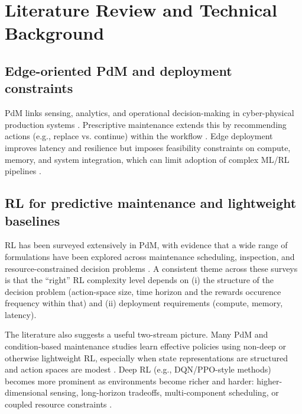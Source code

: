 \documentclass[sn-basic]{sn-jnl} %
\begin{document}
\section{Literature Review and Technical Background}
\label{sec:lit_tech}
\subsection{Edge-oriented PdM and deployment constraints}
PdM links sensing, analytics, and operational decision-making in cyber-physical production systems \cite{Compare2020, Zonta2020}. Prescriptive maintenance extends this by recommending actions (e.g., replace vs. continue) within the workflow \cite{Ansari2019}. Edge deployment improves latency and resilience but imposes feasibility constraints on compute, memory, and system integration, which can limit adoption of complex ML/RL pipelines \cite{Njor2024, Pandey2023}.

\subsection{RL for predictive maintenance and lightweight baselines}
RL has been surveyed extensively in PdM, with evidence that a wide range of formulations have been explored across maintenance scheduling, inspection, and resource-constrained decision problems \cite{Siraskar2023, Ogunfowora2023, Zhang2024}. A consistent theme across these surveys is that the ``right'' RL complexity level depends on (i) the structure of the decision problem (action-space size, time horizon and the rewards occurence frequency within that) and (ii) deployment requirements (compute, memory, latency).

The literature also suggests a useful two-stream picture. Many PdM and condition-based maintenance studies learn effective policies using non-deep or otherwise lightweight RL, especially when state representations are structured and action spaces are modest \cite{Adsule2020, Yousefi2020, Rasay2024, Dadash2024}. Deep RL (e.g., DQN/PPO-style methods) becomes more prominent as environments become richer and harder: higher-dimensional sensing, long-horizon tradeoffs, multi-component scheduling, or coupled resource constraints \cite{Liu2020, Chen2023, Lee2022, Ong2022-02}.
\end{document}
